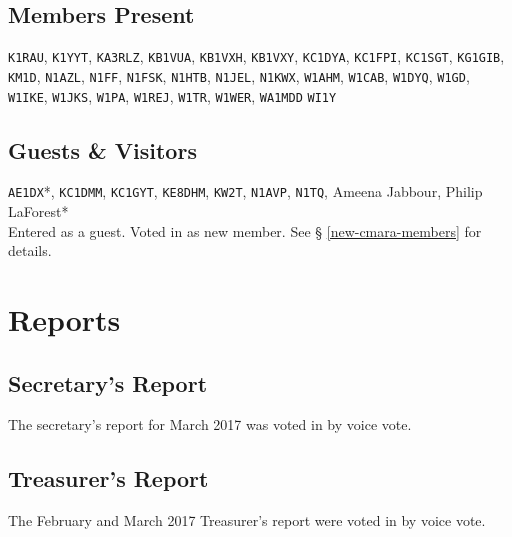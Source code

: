 \documentclass[10pt,letterpaper]{article}
\begin{document}
\subsection{Members Present}
\texttt{K1RAU},
\texttt{K1YYT},
\texttt{KA3RLZ},
\texttt{KB1VUA},
\texttt{KB1VXH},
\texttt{KB1VXY},
\texttt{KC1DYA},
\texttt{KC1FPI},
\texttt{KC1SGT},
\texttt{KG1GIB},
\texttt{KM1D},
\texttt{N1AZL},
\texttt{N1FF},
\texttt{N1FSK},
\texttt{N1HTB},
\texttt{N1JEL},
\texttt{N1KWX},
\texttt{W1AHM},
\texttt{W1CAB},
\texttt{W1DYQ},
\texttt{W1GD},
\texttt{W1IKE},
\texttt{W1JKS},
\texttt{W1PA},
\texttt{W1REJ},
\texttt{W1TR},
\texttt{W1WER},
\texttt{WA1MDD}
\texttt{WI1Y}

\subsection{Guests \& Visitors}
\texttt{AE1DX}*,
\texttt{KC1DMM},
\texttt{KC1GYT},
\texttt{KE8DHM},
\texttt{KW2T},
\texttt{N1AVP},
\texttt{N1TQ},
Ameena Jabbour,
Philip LaForest*\\

\noindent
\textasteriskcentered{} Entered as a guest. Voted in as new member. See \S{} \ref{new-cmara-members} for details.

\section{Reports}

\subsection{Secretary's Report}
The secretary's report for March 2017 was voted in by voice vote.

\newpage
\subsection{Treasurer's Report}
The February and March 2017 Treasurer's report were voted in by voice vote.
\end{document}
